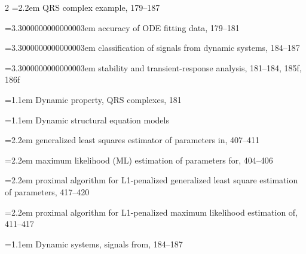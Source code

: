 \begin{multicols}{2}
\noindent\hangindent=2.2em \hspace*{1.1em}QRS complex example, 179--187\par
\noindent\hangindent=3.3000000000000003em \hspace*{2.2em}accuracy of ODE fitting data, 179--181\par
\noindent\hangindent=3.3000000000000003em \hspace*{2.2em}classification of signals from dynamic systems, 184--187\par
\noindent\hangindent=3.3000000000000003em \hspace*{2.2em}stability and transient-response analysis, 181--184, 185f, 186f\par
\noindent\hangindent=1.1em Dynamic property, QRS complexes, 181\par
\noindent\hangindent=1.1em Dynamic structural equation models\par
\noindent\hangindent=2.2em \hspace*{1.1em}generalized least squares estimator of parameters in, 407--411\par
\noindent\hangindent=2.2em \hspace*{1.1em}maximum likelihood (ML) estimation of parameters for, 404--406\par
\noindent\hangindent=2.2em \hspace*{1.1em}proximal algorithm for L1-penalized generalized least square estimation of parameters, 417--420\par
\noindent\hangindent=2.2em \hspace*{1.1em}proximal algorithm for L1-penalized maximum likelihood estimation of, 411--417\par
\noindent\hangindent=1.1em Dynamic systems, signals from, 184--187\par


\end{multicols}

